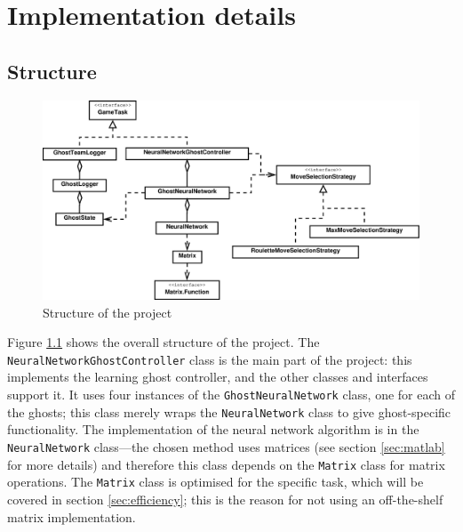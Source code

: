 \chapter{Implementation details}
\label{ch:implementation}

\section{Structure}

\begin{figure}
\includegraphics[width=\linewidth]{diagrams/project2}
\caption{Structure of the project}
\label{fig:project}
\end{figure}

Figure \ref{fig:project} shows the overall structure of the project.  The {\tt NeuralNetworkGhostController} class is the main part of the project: this implements the learning ghost controller, and the other classes and interfaces support it.  It uses four instances of the {\tt GhostNeuralNetwork} class, one for each of the ghosts; this class merely wraps the {\tt NeuralNetwork} class to give ghost-specific functionality.  The implementation of the neural network algorithm is in the {\tt NeuralNetwork} class---the chosen method uses matrices (see section \ref{sec:matlab} for more details) and therefore this class depends on the {\tt Matrix} class for matrix operations.  The {\tt Matrix} class is optimised for the specific task, which will be covered in section \ref{sec:efficiency}; this is the reason for not using an off-the-shelf matrix implementation.


